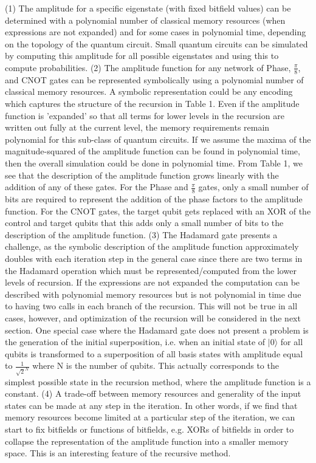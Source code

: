 \documentclass[reqno]{amsart}
\theoremstyle{definition}
\theoremstyle{remark}
\begin{document}
\newpage
(1) The amplitude for a specific eigenstate (with fixed bitfield values) can be determined with a polynomial number of classical memory resources (when expressions are not expanded) and for some cases in polynomial time, depending on the topology of the quantum circuit.  Small quantum circuits can be simulated by computing this amplitude for all possible eigenstates and using this to compute probabilities.
\newline
\newline
(2) The amplitude function for any network of Phase, $\frac{\pi}{8}$, and CNOT gates can be represented symbolically using a polynomial number of classical memory resources. A symbolic representation could be any encoding which captures the structure of the recursion in Table 1. Even if the amplitude function is 'expanded' so that all terms for lower levels in the recursion are written out fully at the current level, the memory requirements remain polynomial for this sub-class of quantum circuits. If we assume the maxima of the magnitude-squared of the amplitude function can be found in polynomial time, then the overall simulation could be done in polynomial time. From Table 1, we see that the description of the amplitude function grows linearly with the addition of any of these gates. For the Phase and $\frac{\pi}{8}$ gates, only a small number of bits are required to represent the addition of the phase factors to the amplitude function. For the CNOT gates, the target qubit gets replaced with an XOR of the control and target qubits that this adds only a small number of bits to the description of the amplitude function. 
\noindent
\newline
\newline
(3) The Hadamard gate presents a challenge, as the symbolic description of the amplitude function approximately doubles with each iteration step in the general case since there are two terms in the Hadamard operation which must be represented/computed from the lower levels of recursion. If the expressions are not expanded the computation can be described with polynomial memory resources but is not polynomial in time due to having two calls in each branch of the recursion. This will not be true in all cases, however, and optimization of the recursion will be considered in the next section. One special case where the Hadamard gate does not present a problem is the generation of the initial superposition, i.e. when an initial state of $|0\rangle$ for all qubits is transformed to a superposition of all basis states with amplitude equal to $\frac{1}{\sqrt{2}^N}$ where N is the number of qubits. This actually corresponds to the simplest possible state in the recursion method, where the amplitude function is a constant. 
\newline
\newline
(4) A trade-off between memory resources and generality of the input states can be made at any step in the iteration. In other words, if we find that memory resources become limited at a particular step of the iteration, we can start to fix bitfields or functions of bitfields, e.g. XORs of bitfields in order to collapse the representation of the amplitude function into a smaller memory space. This is an interesting feature of the recursive method.  
\end{document}
